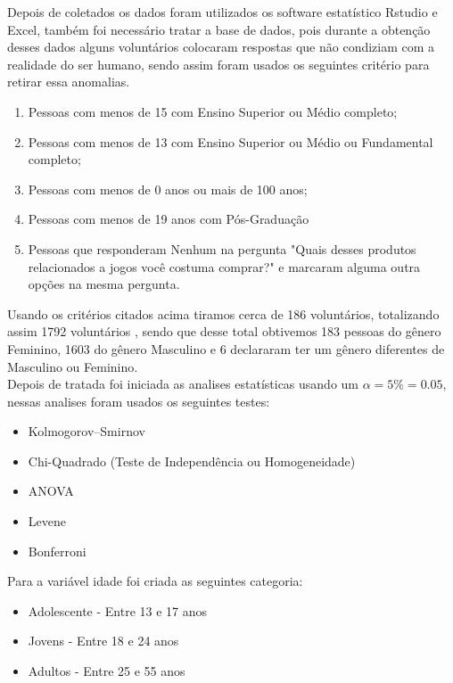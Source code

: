 \documentclass[11pt,a4paper]{article}
\begin{document}
Depois de coletados os dados foram utilizados os software estatístico Rstudio e Excel, também foi necessário tratar a base de dados, pois durante a obtenção desses dados alguns voluntários colocaram respostas que não condiziam com a realidade do ser humano, sendo assim foram usados os seguintes critério para retirar essa anomalias.
 \begin{enumerate}[label=(\roman*)]
\item Pessoas com menos de 15 com Ensino Superior ou Médio completo; 
\item Pessoas com menos de 13 com  Ensino Superior ou Médio  ou Fundamental completo;
\item Pessoas com menos de 0 anos ou mais de 100 anos;
\item Pessoas com menos de 19 anos com Pós-Graduação
\item Pessoas que responderam Nenhum na pergunta "Quais desses produtos relacionados a jogos você costuma comprar?"  e marcaram alguma outra opções na mesma pergunta.
\end{enumerate}
Usando os critérios citados acima tiramos cerca de 186 voluntários, totalizando assim 1792 voluntários , sendo que desse total obtivemos 183 pessoas do gênero Feminino, 1603 do gênero Masculino e 6 declararam ter um gênero diferentes de Masculino  ou Feminino. 
\\

Depois de tratada foi iniciada as analises estatísticas usando um $\alpha=5\%=0.05$, nessas analises foram usados os seguintes testes:
\newline

\begin{itemize}[noitemsep,nolistsep]
\item Kolmogorov–Smirnov
\item Chi-Quadrado (Teste de Independência ou Homogeneidade)
\item ANOVA
\item Levene
\item Bonferroni
\end{itemize}

Para a variável idade foi criada as seguintes categoria:
\newline

\begin{itemize}[noitemsep,nolistsep]
\item Adolescente - Entre  13 e 17 anos
\item Jovens - Entre 18 e 24 anos
\item Adultos - Entre 25 e 55 anos
\end{itemize}
\end{document}
